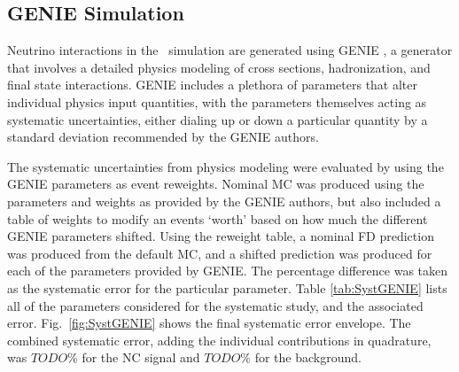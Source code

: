 \subsection{GENIE Simulation}

Neutrino interactions in the \nova~simulation are generated using GENIE \cite{ref:GENIE}, a generator that involves a detailed physics modeling of cross sections, hadronization, and final state interactions. GENIE includes a plethora of parameters that alter individual physics input quantities, with the parameters themselves acting as systematic uncertainties, either dialing up or down a particular quantity by a standard deviation recommended by the GENIE authors.

The systematic uncertainties from physics modeling were evaluated by using the GENIE parameters as event reweights. Nominal MC was produced using the parameters and weights as provided by the GENIE authors, but also included a table of weights to modify an events `worth' based on how much the different GENIE parameters shifted. Using the reweight table, a nominal FD prediction was produced from the default MC, and a shifted prediction was produced for each of the parameters provided by GENIE. The percentage difference was taken as the systematic error for the particular parameter. Table \ref{tab:SystGENIE} lists all of the parameters considered for the systematic study, and the associated error. Fig.~\ref{fig:SystGENIE} shows the final systematic error envelope. The combined systematic error, adding the individual contributions in quadrature, was $TODO\%$ for the NC signal and $TODO\%$ for the background.

